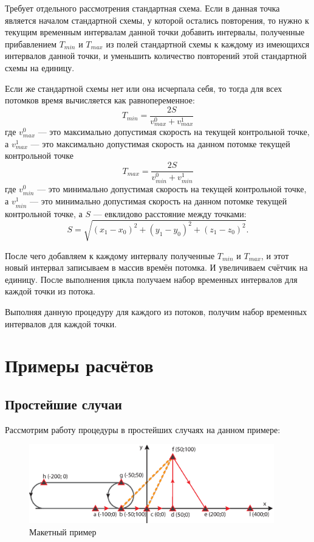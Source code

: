 \documentclass[12pt]{article}
\theoremstyle{plain}
\begin{document}
Требует отдельного рассмотрения стандартная схема. Если в данная точка является началом стандартной схемы, у которой остались повторения, то нужно к текущим временным интервалам данной точки добавить интервалы, полученные прибавлением $T_{min}$ и $T_{max}$ из полей стандартной схемы к каждому из имеющихся интервалов данной точки, и уменьшить количество повторений этой стандартной схемы на единицу. 

Если же стандартной схемы нет или она исчерпала себя, то тогда для всех потомков время вычисляется как равнопеременное:
$$
  T_{min} = \frac{2S}{v_{max}^0 + v_{max}^1}
$$
где $v_{max}^0$ --- это максимально допустимая скорость на текущей контрольной точке, а $v_{max}^1$ --- это максимально допустимая скорость на данном потомке текущей контрольной точке
$$
  T_{max} = \frac{2S}{v_{min}^0 + v_{min}^1}
$$
где $v_{min}^0$ --- это минимально допустимая скорость на текущей контрольной точке, а $v_{min}^1$ --- это минимально допустимая скорость на данном потомке текущей контрольной точке, а $S$ --- евклидово расстояние между точками:
$$
  S = \sqrt{(x_1 - x_0)^2 + (y_1 - y_0)^2 + (z_1 - z_0)^2}.
$$

После чего добавляем к каждому интервалу полученные $T_{min}$ и $T_{max}$, и этот новый интервал записываем в массив времён потомка. И увеличиваем счётчик на единицу. После выполнения цикла получаем набор временных интервалов для каждой точки из потока.

Выполняя данную процедуру для каждого из потоков, получим набор временных интервалов для каждой точки.


\newpage

\section{Примеры расчётов}

\subsection{Простейшие случаи}

Рассмотрим работу процедуры в простейших случаях на данном примере:

\begin{figure}[h]
  \begin{center}
      \includegraphics[width=0.95\textwidth]{Example.eps}
        \caption{Макетный пример}                                                                             
  \end{center}
\end{figure}
\end{document}
